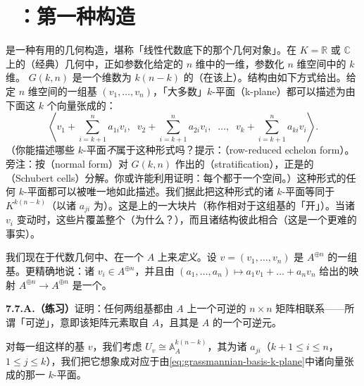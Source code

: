 
\section{\extrahard\ \trGrassmannian{}：第一种构造}

\trGrassmannian{}是一种有用的几何构造，堪称「线性代数底下的那个几何对象」。在\trField{} $K=\mathbb{R}$ 或 $\mathbb{C}$ 上的（经典）几何中，正如\trProjectiveSpace{}参数化给定的 $n$ 维\trVectorSpace{}中的一维\trSubspace{}，\trGrassmannian{}参数化 $n$ 维空间中的 $k$ 维\trSubspace{}。\trGrassmannian{} $G(k,n)$ 是一个维数为 $k(n-k)$ 的\trManifold{}（在该\trField{}上）。\trManifold{}结构由如下方式给出。给定 $n$ 维空间的一组基 $(v_1,\dots,v_n)$，「大多数」$k$-平面（k-plane）都可以描述为由下面这 $k$ 个向量张成的\trSubspace{}：
\begin{equation*}
\left\langle v_1+\sum_{i=k+1}^{n}a_{1i}v_i,\;\;
v_2+\sum_{i=k+1}^{n}a_{2i}v_i,\;\;\dots,\;\;
v_k+\sum_{i=k+1}^{n}a_{ki}v_i\right\rangle.
\tag{7.7.0.1}\label{eq:grassmannian-basis-k-plane}
\end{equation*}
（你能描述哪些 $k$-平面\emph{不}属于这种形式吗？提示：\trRowReducedEchelonForm{}（row-reduced echelon form）。旁注：按\trNormalForm{}（normal form）对 $G(k,n)$ 作出的\trStratification{}（stratification），正是\trGrassmannian{}的\trSchubertCell{}（Schubert cells）分解。你或许能利用\trNormalForm{}证明：每个\trSchubertCell{}都\trIsomorphic{}于一个\trAffine{}空间。）这种形式的任何 $k$-平面都可以被唯一地如此描述。我们据此把这种形式的诸 $k$-平面等同于\trManifold{} $K^{k(n-k)}$（以诸 $a_{ji}$ 为\trCoordinate）。这是\trGrassmannian{}上的一大块\trAffine{}片（称作相对于这组基的「开\trSchubertCell{}」）。当诸 $v_i$ 变动时，这些片覆盖整个\trGrassmannian{}（为什么？），而且诸\trManifold{}结构彼此相合（这是一个更难的事实）。

我们现在于代数几何中、在一个\trRing{} $A$ 上来\emph{定义}\trGrassmannian。设 $v=(v_1,\dots,v_n)$ 是 $A^{\oplus n}$ 的一组基。更精确地说：诸 $v_i\in A^{\oplus n}$，并且由 $(a_1,\dots,a_n)\mapsto a_1v_1+\dots+a_nv_n$ 给出的映射 $A^{\oplus n}\to A^{\oplus n}$ 是一个\trIsomorphism。

\textbf{7.7.A.（练习）}\quad 证明：任何两组基都由 $A$ 上一个可逆的 $n\times n$ 矩阵相联系——所谓「可逆」，意即该矩阵元素取自 $A$，且其\trDeterminant{}是 $A$ 的一个可逆元。

对每一组这样的基 $v$，我们考虑\trScheme{} $U_v\cong\mathbb{A}^{k(n-k)}_A$，其\trCoordinate{}为诸 $a_{ji}$（$k+1\le i\le n$，$1\le j\le k$），我们把它想象成对应于由\eqref{eq:grassmannian-basis-k-plane}中诸向量张成的那一 $k$-平面。

